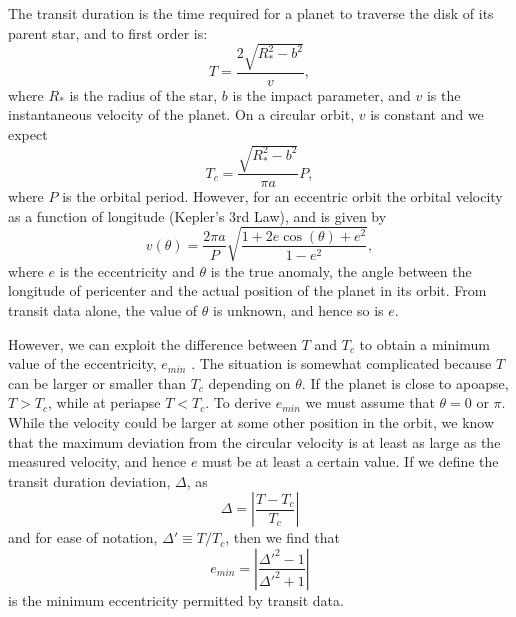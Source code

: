 The transit duration is the time required for a planet to traverse the
disk of its parent star, and to first order is:
\begin{equation}\label{eq:duration}
T = \frac{2 \sqrt{R_*^2 - b^2}}{v},
\end{equation}
where $R_*$ is the radius of the star, $b$ is the impact parameter,
and $v$ is the instantaneous velocity of the planet. On a circular
orbit, $v$ is constant and we expect
\begin{equation}\label{eq:durcirc}
T_c = \frac{\sqrt{R_*^2 - b^2}}{\pi a}P,
\end{equation}
where $P$ is the orbital period. However, for an eccentric orbit the
orbital velocity as a function of longitude (Kepler's 3rd Law), and is
given by
\begin{equation}\label{eq:velocity}
v(\theta) = \frac{2\pi a}{P}\sqrt{\frac{1 + 2e\cos(\theta) + e^2}{1-e^2}},
\end{equation}
where $e$ is the eccentricity and $\theta$ is the true anomaly, the
angle between the longitude of pericenter and the actual position of
the planet in its orbit. From transit data alone, the value of
$\theta$ is unknown, and hence so is $e$.

However, we can exploit the difference between $T$ and $T_c$ to obtain
a minimum value of the eccentricity, $e_{min}$ \citep{Barnes07}. The
situation is somewhat complicated because $T$ can be larger or smaller
than $T_c$ depending on $\theta$. If the planet is close to apoapse,
$T > T_c$, while at periapse $T < T_c$. To derive $e_{min}$ we must
assume that $\theta = 0$ or $\pi$. While the velocity could be larger
at some other position in the orbit, we know that the maximum
deviation from the circular velocity is at least as large as the
measured velocity, and hence $e$ must be at least a certain value. If
we define the transit duration deviation, $\Delta$, as
\begin{equation}\label{eq:tdd}
\Delta = \left|\frac{T-T_c}{T_c}\right|
\end{equation}
and for ease of notation, $\Delta' \equiv T/T_c$,
then we find that
\begin{equation}\label{eq:emin}
e_{min} = \left|\frac{\Delta'^2 - 1}{\Delta'^2 + 1}\right|
\end{equation}
is the minimum eccentricity permitted by transit data.  

